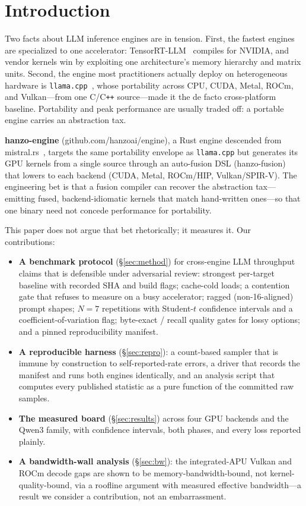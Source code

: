 \documentclass[11pt]{article}
\begin{document}
\section{Introduction}\label{sec:intro}
Two facts about LLM inference engines are in tension. First, the fastest engines are
specialized to one accelerator: TensorRT-LLM~\cite{tensorrtllm} compiles for NVIDIA,
and vendor kernels win by exploiting one architecture's memory hierarchy and matrix
units. Second, the engine most practitioners actually deploy on heterogeneous
hardware is \texttt{llama.cpp}~\cite{llamacpp}, whose portability across CPU, CUDA,
Metal, ROCm, and Vulkan---from one C/C\texttt{++} source---made it the de facto
cross-platform baseline. Portability and peak performance are usually traded off: a
portable engine carries an abstraction tax.

\textbf{hanzo-engine} (github.com/hanzoai/engine), a Rust engine descended from
mistral.rs~\cite{mistralrs}, targets the same portability envelope as
\texttt{llama.cpp} but generates its GPU kernels from a single source through an
auto-fusion DSL (hanzo-fusion) that lowers to each backend (CUDA, Metal, ROCm/HIP,
Vulkan/SPIR-V). The engineering bet is that a fusion compiler can recover the
abstraction tax---emitting fused, backend-idiomatic kernels that match hand-written
ones---so that one binary need not concede performance for portability.

This paper does not argue that bet rhetorically; it measures it. Our contributions:
\begin{itemize}\itemsep2pt
  \item \textbf{A benchmark protocol} (\S\ref{sec:method}) for cross-engine LLM
  throughput claims that is defensible under adversarial review: strongest per-target
  baseline with recorded SHA and build flags; cache-cold loads; a contention gate that
  refuses to measure on a busy accelerator; ragged (non-16-aligned) prompt shapes;
  $N{=}7$ repetitions with Student-$t$ confidence intervals and a coefficient-of-variation
  flag; byte-exact / recall quality gates for lossy options; and a pinned reproducibility
  manifest.
  \item \textbf{A reproducible harness} (\S\ref{sec:repro}): a count-based sampler that is
  immune by construction to self-reported-rate errors, a driver that records the manifest
  and runs both engines identically, and an analysis script that computes every published
  statistic as a pure function of the committed raw samples.
  \item \textbf{The measured board} (\S\ref{sec:results}) across four GPU backends and the
  Qwen3 family, with confidence intervals, both phases, and every loss reported plainly.
  \item \textbf{A bandwidth-wall analysis} (\S\ref{sec:bw}): the integrated-APU Vulkan and
  ROCm decode gaps are shown to be memory-bandwidth-bound, not kernel-quality-bound, via a
  roofline argument with measured effective bandwidth---a result we consider a contribution,
  not an embarrassment.
\end{itemize}
\end{document}

